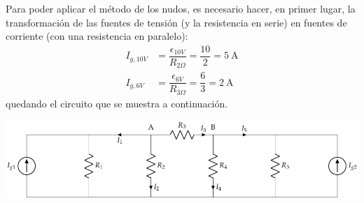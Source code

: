 Para poder aplicar el método de los nudos, es necesario hacer, en
primer lugar, la transformación de las fuentes de tensión (y la
resistencia en serie) en fuentes de corriente (con una resistencia en
paralelo):
\begin{align*}
  I_{g,10V}&=\dfrac{\epsilon_{10V}}{R_{2\Omega}}=\dfrac{10}{2}=\qty{5}{\ampere}\\
  I_{g,6V}&=\dfrac{\epsilon_{6V}}{R_{3\Omega}}=\dfrac{6}{3}=\qty{2}{\ampere}
\end{align*}
quedando el circuito que se muestra a continuación.

\begin{center}
  \includegraphics{figuras/BT1_08_nudos.pdf}
\end{center}

